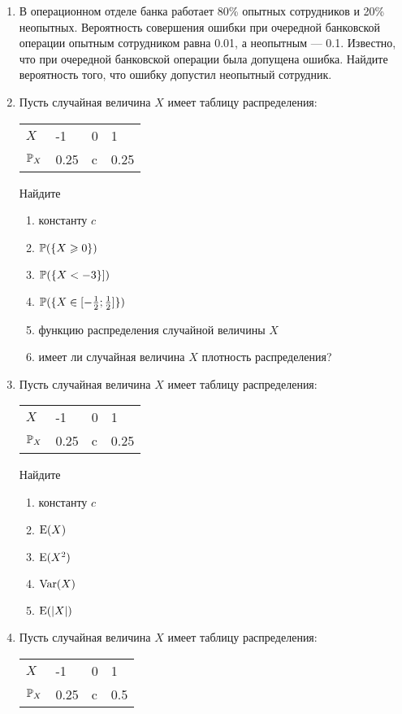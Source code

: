 \begin{enumerate}
\item  В операционном отделе банка работает 80\% опытных сотрудников и 20\%
неопытных. Вероятность совершения ошибки при очередной банковской операции
опытным сотрудником равна 0.01, а неопытным — 0.1. Известно, что при очередной банковской операции была допущена ошибка. Найдите вероятность того, что ошибку допустил неопытный сотрудник.

\item  Пусть случайная величина $X$ имеет таблицу распределения:

\begin{tabular}{ ll l l}
	\toprule
	$X$ & -1  & 0  & 1 \\
	$\P_X$ & 0.25  & c  & 0.25 \\
  \bottomrule
\end{tabular}

Найдите
	\begin{enumerate}
	\item константу $c$
	\item $\P(\{X \geq 0\})$
	\item $\P(\{X < -3\}])$
	\item $\P(\{X \in [-\frac{1}{2}; \frac{1}{2}]\})$
	\item функцию распределения случайной величины $X$
	\item имеет ли случайная величина $X$ плотность распределения?
	\end{enumerate}


\item  Пусть случайная величина $X$ имеет таблицу распределения:

\begin{tabular}{ llll}
\toprule
$X$ & -1  & 0  & 1 \\
$\P_X$ & 0.25  & c  & 0.25 \\
\bottomrule
\end{tabular}

Найдите
\begin{enumerate}
	\item константу $c$
	\item $\E(X)$
	\item $\E(X^2)$
	\item $\Var(X)$
	\item $\E(|X|)$
\end{enumerate}

\item  Пусть случайная величина $X$ имеет таблицу распределения:

\begin{tabular}{ lll l}
\toprule
$X$ & -1  & 0  & 1 \\
$\P_X$ & 0.25  & c  & 0.5 \\
\bottomrule
\end{tabular}


\end{enumerate}
